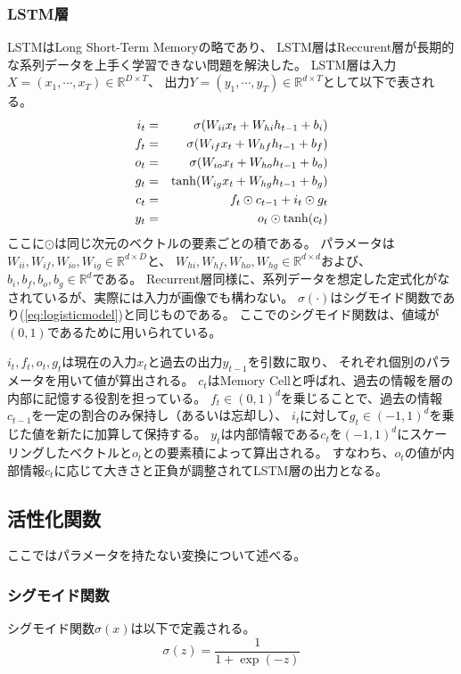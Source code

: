 \subsubsection{\rm LSTM\mc 層}
LSTMはLong Short-Term Memoryの略であり、
LSTM層はReccurent層が長期的な系列データを上手く学習できない問題を解決した\cite{LSTM}。
LSTM層は入力\(X = (x_1,\cdots,x_T)\in \mathbb R^{D \times T}\)、
出力\(Y = (y_1,\cdots,y_T)\in \mathbb R^{d \times T}\)として以下で表される。
\begin{eqnarray}
    i_t &=& \sigma(W_{ii}x_t + W_{hi} h_{t-1} + b_i) \\
    f_t &=& \sigma(W_{if}x_t + W_{hf} h_{t-1} + b_f) \\
    o_t &=& \sigma(W_{io}x_t + W_{ho} h_{t-1} + b_o) \\
    g_t &=& {\rm tanh}(W_{ig}x_t + W_{hg} h_{t-1} + b_g) \\
    c_t &=& f_t \odot c_{t-1} + i_t \odot g_t \\
    y_t &=& o_t \odot {\rm tanh}(c_t)
    \label{eq:LSTM}
\end{eqnarray}
ここに\(\odot\)は同じ次元のベクトルの要素ごとの積である。
パラメータは\(W_{ii},W_{if},W_{io},W_{ig} \in \mathbb R^{d\times D}\)と、
\(W_{hi},W_{hf},W_{ho},W_{hg} \in \mathbb R^{d\times d}\)および、
\(b_{i},b_{f},b_{o},b_{g} \in \mathbb R^d\)である。
Recurrent層同様に、系列データを想定した定式化がなされているが、実際には入力が画像でも構わない。
\(\sigma(\cdot)\)はシグモイド関数であり(\ref{eq:logisticmodel})と同じものである。
ここでのシグモイド関数は、値域が\((0,1)\)であるために用いられている。

\(i_t,f_t,o_t,g_t\)は現在の入力\(x_t\)と過去の出力\(y_{t-1}\)を引数に取り、
それぞれ個別のパラメータを用いて値が算出される。
\(c_t\)はMemory Cellと呼ばれ、過去の情報を層の内部に記憶する役割を担っている。
\(f_t \in (0,1)^d \)を乗じることで、過去の情報\(c_{t-1}\)を一定の割合のみ保持し（あるいは忘却し）、
\(i_t\)に対して\(g_t \in (-1,1)^d\)を乗じた値を新たに加算して保持する。
\(y_t\)は内部情報である\(c_t\)を\((-1,1)^d\)にスケーリングしたベクトルと\(o_t\)との要素積によって算出される。
すなわち、\(o_t\)の値が内部情報\(c_t\)に応じて大きさと正負が調整されてLSTM層の出力となる。

\subsection{\mc 活性化関数}
ここではパラメータを持たない変換について述べる。
\subsubsection{\mc シグモイド関数}
シグモイド関数\(\sigma(x)\)は以下で定義される。
\begin{equation}
    \sigma(z) = \frac{1}{1+\exp(-z)}
\end{equation}

